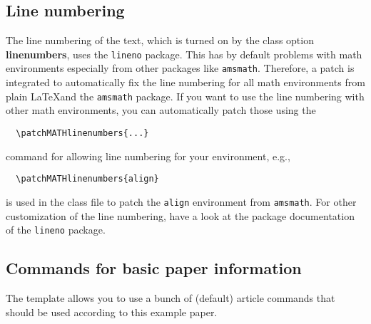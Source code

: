 \documentclass[%
  a4paper,
  twocolumn,
  algotwoe,
]{preprint}
\begin{document}

\subsection{Line numbering}%
\label{subsec:linenumbers}

The line numbering of the text, which is turned on by the class option
\textbf{\textsf{linenumbers}}, uses the \verb|lineno| package.
This has by default problems with math environments especially from other
packages like \verb|amsmath|.
Therefore, a patch is integrated to automatically fix the line numbering for all
math environments from plain \LaTeX and the \verb|amsmath| package.
If you want to use the line numbering with other math environments, you can
automatically patch those using the
\begin{verbatim}
  \patchMATHlinenumbers{...}
\end{verbatim}
command for allowing line numbering for your environment, e.g.,
\begin{verbatim}
  \patchMATHlinenumbers{align}
\end{verbatim}
is used in the class file to patch the \verb|align| environment from
\verb|amsmath|.
For other customization of the line numbering, have a look at the package
documentation of the \verb|lineno| package.


\subsection{Commands for basic paper information}%
\label{subsec:meta}

The template allows you to use a bunch of (default) article commands that should
be used according to this example paper.
\end{document}
